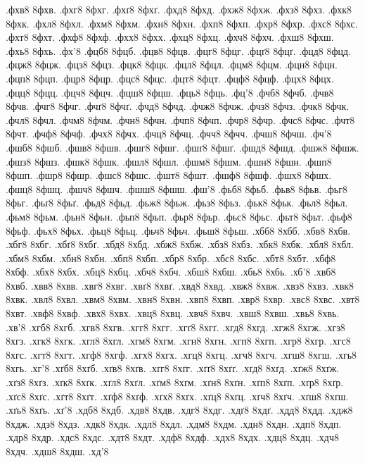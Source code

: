 {.фхв8
8фхв.
.фхг8
8фхг.
.фхґ8
8фхґ.
.фхд8
8фхд.
.фхж8
8фхж.
.фхз8
8фхз.
.фхк8
8фхк.
.фхл8
8фхл.
.фхм8
8фхм.
.фхн8
8фхн.
.фхп8
8фхп.
.фхр8
8фхр.
.фхс8
8фхс.
.фхт8
8фхт.
.фхф8
8фхф.
.фхх8
8фхх.
.фхц8
8фхц.
.фхч8
8фхч.
.фхш8
8фхш.
.фхь8
8фхь.
.фх'8
.фцб8
8фцб.
.фцв8
8фцв.
.фцг8
8фцг.
.фцґ8
8фцґ.
.фцд8
8фцд.
.фцж8
8фцж.
.фцз8
8фцз.
.фцк8
8фцк.
.фцл8
8фцл.
.фцм8
8фцм.
.фцн8
8фцн.
.фцп8
8фцп.
.фцр8
8фцр.
.фцс8
8фцс.
.фцт8
8фцт.
.фцф8
8фцф.
.фцх8
8фцх.
.фцц8
8фцц.
.фцч8
8фцч.
.фцш8
8фцш.
.фць8
8фць.
.фц'8
.фчб8
8фчб.
.фчв8
8фчв.
.фчг8
8фчг.
.фчґ8
8фчґ.
.фчд8
8фчд.
.фчж8
8фчж.
.фчз8
8фчз.
.фчк8
8фчк.
.фчл8
8фчл.
.фчм8
8фчм.
.фчн8
8фчн.
.фчп8
8фчп.
.фчр8
8фчр.
.фчс8
8фчс.
.фчт8
8фчт.
.фчф8
8фчф.
.фчх8
8фчх.
.фчц8
8фчц.
.фчч8
8фчч.
.фчш8
8фчш.
.фч'8
.фшб8
8фшб.
.фшв8
8фшв.
.фшг8
8фшг.
.фшґ8
8фшґ.
.фшд8
8фшд.
.фшж8
8фшж.
.фшз8
8фшз.
.фшк8
8фшк.
.фшл8
8фшл.
.фшм8
8фшм.
.фшн8
8фшн.
.фшп8
8фшп.
.фшр8
8фшр.
.фшс8
8фшс.
.фшт8
8фшт.
.фшф8
8фшф.
.фшх8
8фшх.
.фшц8
8фшц.
.фшч8
8фшч.
.фшш8
8фшш.
.фш'8
.фьб8
8фьб.
.фьв8
8фьв.
.фьг8
8фьг.
.фьґ8
8фьґ.
.фьд8
8фьд.
.фьж8
8фьж.
.фьз8
8фьз.
.фьк8
8фьк.
.фьл8
8фьл.
.фьм8
8фьм.
.фьн8
8фьн.
.фьп8
8фьп.
.фьр8
8фьр.
.фьс8
8фьс.
.фьт8
8фьт.
.фьф8
8фьф.
.фьх8
8фьх.
.фьц8
8фьц.
.фьч8
8фьч.
.фьш8
8фьш.
.хбб8
8хбб.
.хбв8
8хбв.
.хбг8
8хбг.
.хбґ8
8хбґ.
.хбд8
8хбд.
.хбж8
8хбж.
.хбз8
8хбз.
.хбк8
8хбк.
.хбл8
8хбл.
.хбм8
8хбм.
.хбн8
8хбн.
.хбп8
8хбп.
.хбр8
8хбр.
.хбс8
8хбс.
.хбт8
8хбт.
.хбф8
8хбф.
.хбх8
8хбх.
.хбц8
8хбц.
.хбч8
8хбч.
.хбш8
8хбш.
.хбь8
8хбь.
.хб'8
.хвб8
8хвб.
.хвв8
8хвв.
.хвг8
8хвг.
.хвґ8
8хвґ.
.хвд8
8хвд.
.хвж8
8хвж.
.хвз8
8хвз.
.хвк8
8хвк.
.хвл8
8хвл.
.хвм8
8хвм.
.хвн8
8хвн.
.хвп8
8хвп.
.хвр8
8хвр.
.хвс8
8хвс.
.хвт8
8хвт.
.хвф8
8хвф.
.хвх8
8хвх.
.хвц8
8хвц.
.хвч8
8хвч.
.хвш8
8хвш.
.хвь8
8хвь.
.хв'8
.хгб8
8хгб.
.хгв8
8хгв.
.хгг8
8хгг.
.хгґ8
8хгґ.
.хгд8
8хгд.
.хгж8
8хгж.
.хгз8
8хгз.
.хгк8
8хгк.
.хгл8
8хгл.
.хгм8
8хгм.
.хгн8
8хгн.
.хгп8
8хгп.
.хгр8
8хгр.
.хгс8
8хгс.
.хгт8
8хгт.
.хгф8
8хгф.
.хгх8
8хгх.
.хгц8
8хгц.
.хгч8
8хгч.
.хгш8
8хгш.
.хгь8
8хгь.
.хг'8
.хґб8
8хґб.
.хґв8
8хґв.
.хґг8
8хґг.
.хґґ8
8хґґ.
.хґд8
8хґд.
.хґж8
8хґж.
.хґз8
8хґз.
.хґк8
8хґк.
.хґл8
8хґл.
.хґм8
8хґм.
.хґн8
8хґн.
.хґп8
8хґп.
.хґр8
8хґр.
.хґс8
8хґс.
.хґт8
8хґт.
.хґф8
8хґф.
.хґх8
8хґх.
.хґц8
8хґц.
.хґч8
8хґч.
.хґш8
8хґш.
.хґь8
8хґь.
.хґ'8
.хдб8
8хдб.
.хдв8
8хдв.
.хдг8
8хдг.
.хдґ8
8хдґ.
.хдд8
8хдд.
.хдж8
8хдж.
.хдз8
8хдз.
.хдк8
8хдк.
.хдл8
8хдл.
.хдм8
8хдм.
.хдн8
8хдн.
.хдп8
8хдп.
.хдр8
8хдр.
.хдс8
8хдс.
.хдт8
8хдт.
.хдф8
8хдф.
.хдх8
8хдх.
.хдц8
8хдц.
.хдч8
8хдч.
.хдш8
8хдш.
.хд'8
}

